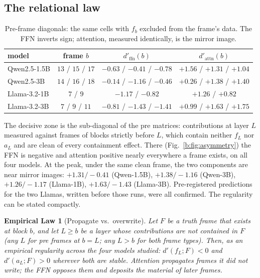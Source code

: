 \documentclass[11pt]{article}
\newtheorem{law}{Empirical Law}
\begin{document}
\subsection{The relational law}
\label{b:sec:law}

\begin{table}[H]
\centering
\caption{Pre-frame diagonals: the same cells with $f_b$ excluded from the
frame's data. The FFN inverts sign; attention, measured identically, is the
mirror image.}
\label{b:tab:pre}
\begin{tabular}{lccc}
\toprule
model & frame $b$ & $d'_{\mathrm{ffn}}(b)$ & $d'_{\mathrm{attn}}(b)$ \\
\midrule
Qwen2.5-1.5B & $13$ / $15$ / $17$ & $-0.63$ / $-0.41$ / $-0.78$ & $+1.56$ / $+1.31$ / $+1.04$ \\
Qwen2.5-3B   & $14$ / $16$ / $18$ & $-0.14$ / $-1.16$ / $-0.46$ & $+0.26$ / $+1.38$ / $+1.40$ \\
Llama-3.2-1B & $7$ / $9$          & $-1.17$ / $-0.82$           & $+1.26$ / $+0.82$ \\
Llama-3.2-3B & $7$ / $9$ / $11$   & $-0.81$ / $-1.43$ / $-1.41$ & $+0.99$ / $+1.63$ / $+1.75$ \\
\bottomrule
\end{tabular}
\end{table}

The decisive zone is the sub-diagonal of the pre matrices: contributions at
layer $L$ measured against frames of blocks strictly before $L$, which
contain neither $f_L$ nor $a_L$ and are clean of every containment effect.
There (Fig.~\ref{b:fig:asymmetry}) the FFN is negative and attention positive
nearly everywhere a frame exists, on all four models. At the peak, under
the same clean frame, the two components are near mirror images:
$+1.31/-0.41$ (Qwen-1.5B), $+1.38/-1.16$ (Qwen-3B), $+1.26/-1.17$
(Llama-1B), $+1.63/-1.43$ (Llama-3B). Pre-registered predictions for the
two Llamas, written before those runs, were all confirmed. The regularity
can be stated compactly.

\begin{law}[Propagate vs.\ overwrite]
\label{b:law:relational}
Let $F$ be a truth frame that exists at block $b$, and let $L \geq b$ be a
layer whose contributions are not contained in $F$ (any $L$ for pre frames
at $b = L$; any $L > b$ for both frame types). Then, as an empirical
regularity across the four models studied: $d'(f_L; F) < 0$ and
$d'(a_L; F) > 0$ wherever both are stable. Attention propagates frames it
did not write; the FFN opposes them and deposits the material of later
frames.
\end{law}
\end{document}
